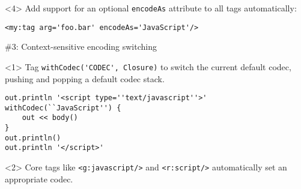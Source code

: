 \begin{frame}
    \begin{onlyenv}<4>
      Add support for an optional \verb|encodeAs| attribute to all tags automatically:
      \begin{center}
        \begin{minipage}{\textwidth}
          \begin{verbatim}
<my:tag arg='foo.bar' encodeAs='JavaScript'/>
          \end{verbatim}
        \end{minipage}
      \end{center}
    \end{onlyenv}

\end{frame}



\begin{frame}

    \begin{center}
      \Huge\color{green} \#3: Context-sensitive encoding switching
    \end{center}

    \vspace{1cm}

    \begin{onlyenv}<1>
      Tag \verb|withCodec('CODEC', Closure)| to switch the current default codec, pushing and popping a default codec stack.
      \begin{center}
        \begin{minipage}{\textwidth}
          \begin{verbatim}
out.println '<script type=''text/javascript''>'
withCodec(``JavaScript'') {
    out << body()
}
out.println()
out.println '</script>'
          \end{verbatim}
        \end{minipage}
      \end{center}
    \end{onlyenv}

    \begin{onlyenv}<2>
      Core tags like \verb|<g:javascript/>| and \verb|<r:script/>| automatically set an appropriate codec.
    \end{onlyenv}

\end{frame}



